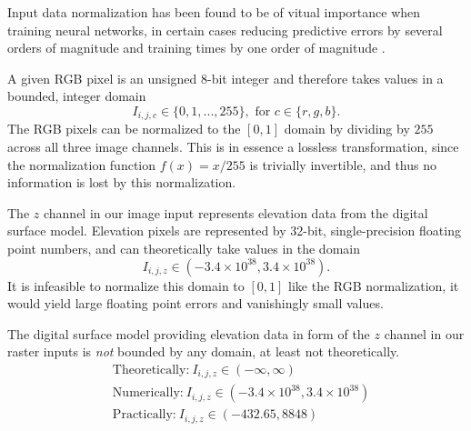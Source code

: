 Input data normalization has been found to be of vitual importance when training neural networks, in certain cases reducing predictive errors by several orders of magnitude and training times by one order of magnitude \cite{input_normalization_1997}.


A given RGB pixel is an unsigned 8-bit integer and therefore takes values in a bounded, integer domain
%
\begin{equation*}
  I_{i,j,c} \in \{0, 1, ..., 255\}, \text{ for } c \in \{r, g, b\}.
\end{equation*}
%
The RGB pixels can be normalized to the $[0, 1]$ domain by dividing by $255$ across all three image channels.
This is in essence a lossless transformation, since the normalization function $f(x) = x/255$ is trivially invertible, and thus no information is lost by this normalization.

The $z$ channel in our image input represents elevation data from the digital surface model.
Elevation pixels are represented by 32-bit, single-precision floating point numbers, and can theoretically take values in the domain
%
\begin{equation*}
  I_{i,j,z} \in (-3.4 \times 10^{38}, 3.4 \times 10^{38}).
\end{equation*}
%
It is infeasible to normalize this domain to $[0, 1]$ like the RGB normalization, it would yield large floating point errors and vanishingly small values.

The digital surface model providing elevation data in form of the $z$ channel in our raster inputs is \textit{not} bounded by any domain, at least not theoretically.
~
\begin{align*}
  &\text{Theoretically:} ~ I_{i,j,z} \in (-\infty, \infty)
  \\
  &\text{Numerically:} ~ I_{i,j,z} \in (-3.4 \times 10^{38}, 3.4 \times 10^{38})
  \\
  &\text{Practically:} ~ I_{i,j,z} \in (-432.65, 8848)
\end{align*}

